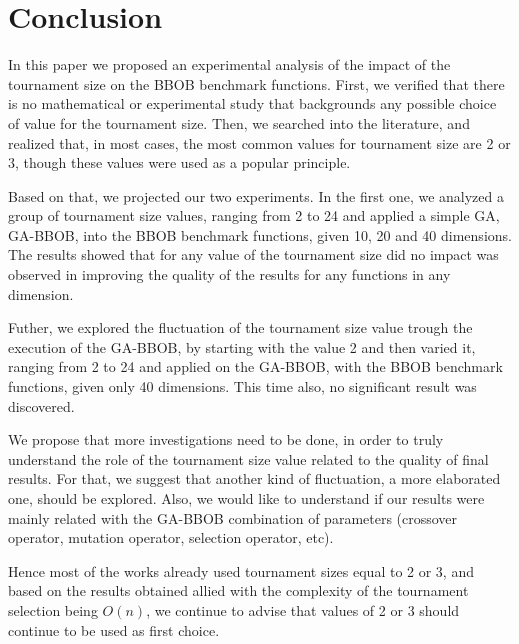 \section{Conclusion}
\label{sec:conclusion}


In this paper we proposed an experimental analysis of the impact of the tournament size on the BBOB benchmark functions. First, we verified that there is no mathematical or experimental study that backgrounds any possible choice of value for the tournament size. Then, we searched into the literature, and realized that, in most cases, the most common values for tournament size are 2 or 3, though these values were used as a popular principle. 

Based on that, we projected our two experiments. In the first one, we analyzed a group of tournament size values, ranging from 2 to 24 and applied a simple GA, GA-BBOB, into the BBOB benchmark functions, given 10, 20 and 40 dimensions. The results showed that for any value of the tournament size did no impact was observed in improving the quality of the results for any functions in any dimension.

Futher, we explored the fluctuation of the tournament size value trough the execution of the GA-BBOB, by starting with the value 2 and then varied it, ranging from 2 to 24 and applied on the GA-BBOB, with the BBOB benchmark functions, given only 40 dimensions. This time also, no significant result was discovered.

We propose that more investigations need to be done, in order to truly understand the role of the tournament size value related to the quality of final results. For that, we suggest that another kind of fluctuation, a more elaborated one, should be explored. Also, we would like to understand if our results were mainly related with the GA-BBOB combination of parameters (crossover operator, mutation operator, selection operator, etc).

Hence most of the works already used tournament sizes equal to 2 or 3, and based on the results obtained allied with the complexity of the tournament selection being $O(n)$, we continue to advise that values of 2 or 3 should continue to be used as first choice.
